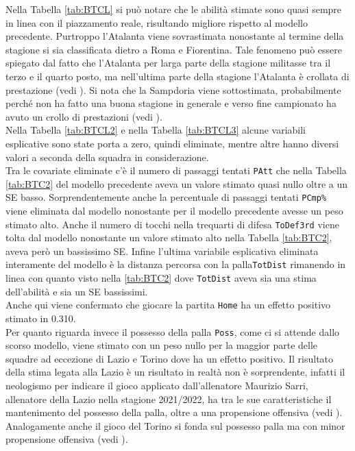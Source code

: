 Nella Tabella \ref{tab:BTCL} si può notare che le abilità stimate sono quasi sempre  in linea con il piazzamento reale, risultando migliore rispetto al modello precedente. Purtroppo l'Atalanta viene sovrastimata nonostante al termine della stagione si sia classificata dietro a Roma e Fiorentina. Tale fenomeno può essere spiegato dal fatto che l'Atalanta per larga parte della stagione militasse tra il terzo e il quarto posto, ma nell'ultima parte della stagione l'Atalanta è crollata di prestazione (vedi \textit{\cite{site:storyAta}}). Si nota che la Sampdoria viene sottostimata, probabilmente perché non ha fatto una buona stagione in generale e verso fine campionato ha avuto un crollo di prestazioni (vedi \textit{\cite{site:storySamp}}).\\

Nella Tabella \ref{tab:BTCL2} e nella Tabella \ref{tab:BTCL3} alcune variabili esplicative sono state porta a zero, quindi eliminate, mentre altre hanno diversi valori a seconda della squadra in considerazione. \\
Tra le covariate eliminate c'è il numero di passaggi tentati \texttt{PAtt} che nella Tabella \ref{tab:BTC2} del modello precedente aveva un valore stimato quasi nullo oltre a un SE basso. Sorprendentemente anche la percentuale di passaggi tentati \texttt{PCmp\%} viene eliminata dal modello nonostante per il modello precedente avesse un peso stimato alto. Anche il numero di tocchi nella trequarti di difesa \texttt{ToDef3rd} viene tolta dal modello nonostante un valore stimato alto nella Tabella \ref{tab:BTC2}, aveva però un bassissimo SE. Infine l'ultima variabile esplicativa eliminata interamente del modello è la distanza percorsa con la palla\texttt{TotDist} rimanendo in linea con quanto visto nella \ref{tab:BTC2} dove \texttt{TotDist} aveva sia una stima dell'abilità e sia un SE bassissimi.\\
Anche qui viene confermato che giocare la partita \texttt{Home} ha un effetto positivo stimato in 0.310.\\
Per quanto riguarda invece il possesso della palla \texttt{Poss}, come ci si attende dallo scorso modello, viene stimato con un peso nullo per la maggior parte delle squadre ad eccezione di Lazio e Torino dove ha un effetto positivo. Il risultato della stima legata alla Lazio è un risultato in realtà non è sorprendente, infatti il \textit{\cite{site:sarrismotr}} neologismo per indicare il gioco applicato dall'allenatore Maurizio Sarri, allenatore della Lazio nella stagione 2021/2022, ha tra le sue caratteristiche il mantenimento del possesso della palla, oltre a una propensione offensiva (vedi \textit{\cite{site:sarrismo}}). Analogamente anche il gioco del Torino si fonda sul possesso palla ma con minor propensione offensiva (vedi \textit{\cite{site:torino}}).\\
